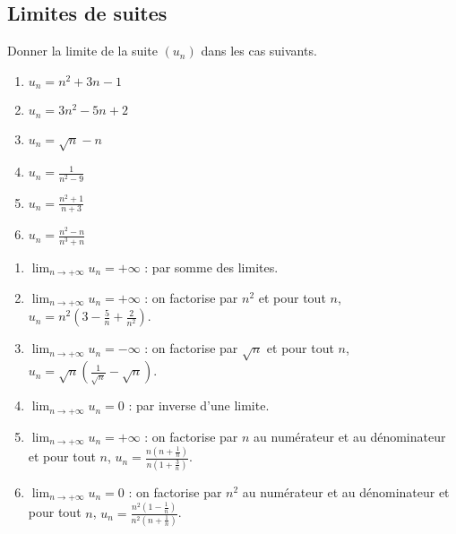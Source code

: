 \documentclass[12pt,a4paper,french]{article}
\begin{document}
\subsection{Limites de suites}

\begin{question}
  Donner la limite de la suite $(u_n)$ dans les cas suivants.
  \begin{enumerate}
    \item $u_n = n^2 + 3n - 1$
    \item $u_n = 3n^2 - 5n + 2$
    \item $u_n = \sqrt{n} - n$
    \item $u_n = \frac{1}{n^2 - 9}$
    \item $u_n = \frac{n^2 + 1}{n +3}$
    \item $u_n = \frac{n^2 - n}{n^3 + n}$
  \end{enumerate}
\end{question}
\begin{solution}
  \begin{enumerate}
    \item $\lim_{n \to +\infty} u_n = +\infty$ : par somme des limites.
    \item $\lim_{n \to +\infty} u_n = +\infty$ : on factorise par $n^2$ et
      pour tout $n$, $u_n = n^2\left(3 - \frac5n + \frac2{n^2}\right)$.
    \item $\lim_{n \to +\infty} u_n = - \infty$ : on factorise par
      $\sqrt{n}$ et pour tout $n$, $u_n = \sqrt{n} \left( \frac{1}{\sqrt{n}}
      - \sqrt{n} \right)$.
    \item $\lim_{n \to +\infty} u_n = 0$ : par inverse d'une limite.
    \item $\lim_{n \to +\infty} u_n = +\infty$ : on factorise par $n$ au
      numérateur et au dénominateur et pour tout $n$, $u_n = \frac{n \left(
      n + \frac{1}{n} \right)}{n \left( 1 + \frac{3}n \right)} $.
    \item $\lim_{n \to +\infty} u_n = 0$ : on factorise par $n^2$ au
      numérateur et au dénominateur et pour tout $n$, $u_n = \frac{n^2
      \left( 1 - \frac{1}n \right)}{n^2 \left(n + \frac1n \right)}$.
  \end{enumerate}
\end{solution}
\end{document}
